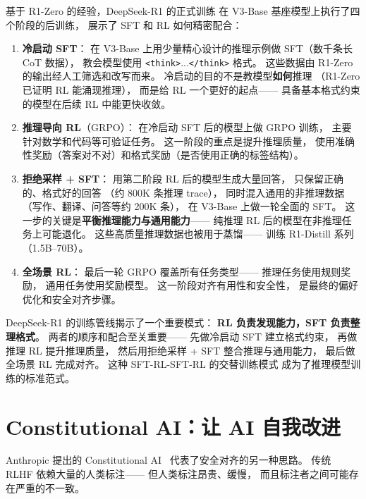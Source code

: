 基于 R1-Zero 的经验，DeepSeek-R1 的正式训练
在 V3-Base 基座模型上执行了四个阶段的后训练，
展示了 SFT 和 RL 如何精密配合：
\begin{enumerate}[noitemsep]
  \item \textbf{冷启动 SFT}：
        在 V3-Base 上用少量精心设计的推理示例做 SFT（数千条长 CoT 数据），
        教会模型使用 \texttt{<think>}...\texttt{</think>} 格式。
        这些数据由 R1-Zero 的输出经人工筛选和改写而来。
        冷启动的目的不是教模型\textbf{如何}推理
       （R1-Zero 已证明 RL 能涌现推理），
        而是给 RL 一个更好的起点——
        具备基本格式约束的模型在后续 RL 中能更快收敛。
  \item \textbf{推理导向 RL}（GRPO）：
        在冷启动 SFT 后的模型上做 GRPO 训练，
        主要针对数学和代码等可验证任务。
        这一阶段的重点是提升推理质量，
        使用准确性奖励（答案对不对）和格式奖励（是否使用正确的标签结构）。
  \item \textbf{拒绝采样 + SFT}：
        用第二阶段 RL 后的模型生成大量回答，
        只保留正确的、格式好的回答
       （约 800K 条推理 trace），
        同时混入通用的非推理数据
       （写作、翻译、问答等约 200K 条），
        在 V3-Base 上做一轮全面的 SFT。
        这一步的关键是\textbf{平衡推理能力与通用能力}——
        纯推理 RL 后的模型在非推理任务上可能退化。
        这些高质量推理数据也被用于蒸馏——
        训练 R1-Distill 系列（1.5B--70B）。
  \item \textbf{全场景 RL}：
        最后一轮 GRPO 覆盖所有任务类型——
        推理任务使用规则奖励，
        通用任务使用奖励模型。
        这一阶段对齐有用性和安全性，
        是最终的偏好优化和安全对齐步骤。
\end{enumerate}

\begin{keybox}[R1 训练的核心洞见]
DeepSeek-R1 的训练管线揭示了一个重要模式：
\textbf{RL 负责发现能力，SFT 负责整理格式}。
两者的顺序和配合至关重要——
先做冷启动 SFT 建立格式约束，
再做推理 RL 提升推理质量，
然后用拒绝采样 + SFT 整合推理与通用能力，
最后做全场景 RL 完成对齐。
这种 SFT-RL-SFT-RL 的交替训练模式
成为了推理模型训练的标准范式。
\end{keybox}

\section{Constitutional AI：让 AI 自我改进}

Anthropic 提出的 Constitutional AI~\cite{bai2022constitutional}
代表了安全对齐的另一种思路。
传统 RLHF 依赖大量的人类标注——
但人类标注昂贵、缓慢，
而且标注者之间可能存在严重的不一致。

